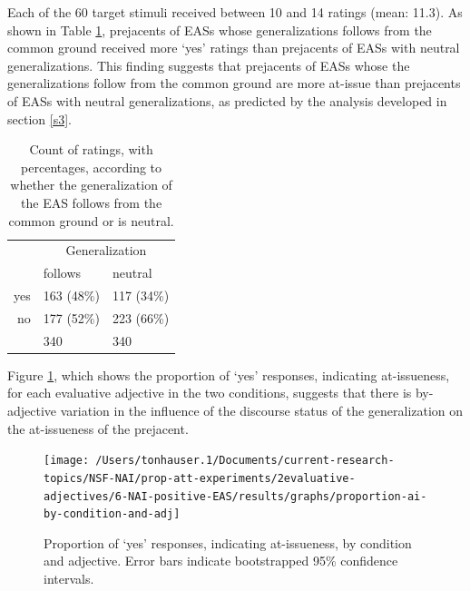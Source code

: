 \documentclass[11pt,fleqn]{article}
\newcommand{\6}{\mbox{$[\hspace*{-.6mm}[$}}
\newcommand{\9}{\mbox{$]\hspace*{-.6mm}]$}}
\begin{document}
Each of the 60 target stimuli received between 10 and 14 ratings (mean: 11.3). As shown in Table \ref{t-ai}, prejacents of EASs whose generalizations follows from the common ground  received more `yes' ratings than prejacents of EASs with neutral generalizations. This finding suggests that prejacents of EASs whose the generalizations follow from the common ground are more at-issue than prejacents of EASs with neutral generalizations, as predicted by the analysis developed in section \ref{s3}.

\begin{table}[h!]
\centering

\begin{tabular}{r|ll}

 & \multicolumn{2}{c}{Generalization} \\

 &  follows & neutral   \\ 
 
 \toprule

yes & 163 (48\%) & 117 (34\%) \\ 

no & 177 (52\%) & 223 (66\%) \\ 

\hline

& 340 & 340 \\ 

\end{tabular}

\caption{Count of ratings, with percentages, according to whether the generalization of the EAS follows from the common ground or is neutral.}\label{t-ai}

\end{table}

Figure \ref{f-ai-by-adj}, which shows the proportion of `yes' responses, indicating at-issueness, for each evaluative adjective in the two conditions, suggests that there is by-adjective variation in the influence of the discourse status of the generalization on the at-issueness of the prejacent.

\begin{figure}[H]
\begin{center}
\texttt{[image: /Users/tonhauser.1/Documents/current-research-topics/NSF-NAI/prop-att-experiments/2evaluative-adjectives/6-NAI-positive-EAS/results/graphs/proportion-ai-by-condition-and-adj]}

\caption{Proportion of `yes' responses, indicating at-issueness, by condition and adjective. Error bars indicate bootstrapped 95\% confidence intervals.}\label{f-ai-by-adj}
\end{center}
\end{figure}
\end{document}
